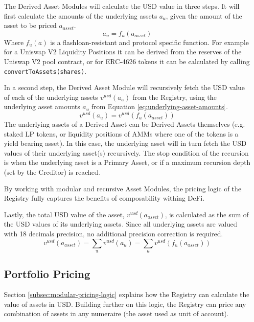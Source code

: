 \documentclass[sigconf,nonacm]{acmart}
\begin{document}
The Derived Asset Modules will calculate the USD value in three steps.
It will first calculate the amounts of the underlying assets $a_{u}$, given the amount of the asset to be priced $a_{asset}$.
\begin{equation}
    \label{eq:underlying-asset-amounts}
    a_{u} = f_{u}(a_{asset})
\end{equation}
Where $f_{u}(a)$ is a flashloan-resistant and protocol specific function.
For example for a Uniswap V2 Liquidity Positions it can be derived from the reserves of the Uniswap V2 pool contract,
or for ERC-4626 tokens it can be calculated by calling \texttt{convertToAssets(shares)}.

In a second step, the Derived Asset Module will recursively fetch the USD value of each of the underlying assets $v^{usd}(a_{u})$ from the Registry,
using the underlying asset amounts $a_{u}$ from Equation \ref{eq:underlying-asset-amounts}.
\begin{equation}
    v^{usd}(a_{u}) = v^{usd}(f_{u}(a_{asset}))
\end{equation}
The underlying assets of a Derived Asset can be Derived Assets themselves (e.g. staked LP tokens, or liquidity positions of AMMs where one of the tokens is a yield bearing asset).
In this case, the underlying asset will in turn fetch the USD values  of their underlying asset(s) recursively.
The stop condition of the recursion is when the underlying asset is a Primary Asset, or if a maximum recursion depth (set by the Creditor) is reached.

By working with modular and recursive Asset Modules, the pricing logic of the Registry fully captures the benefits of composability withing DeFi.

Lastly, the total USD value of the asset, $v^{usd}(a_{asset})$, is calculated as the sum of the USD values of its underlying assets.
Since all underlying assets are valued with 18 decimals precision, no additional precision correction is required.
\begin{equation}
    v^{usd}(a_{asset}) = \sum_{u}{v^{usd}(a_{u})} = \sum_{u}{v^{usd}(f_{u}(a_{asset}))}
\end{equation}

\subsection{Portfolio Pricing}
\label{subsec:portfolio-pricing}
Section \ref{subsec:modular-pricing-logic} explains how the Registry can calculate the value of assets in USD.
Building further on this logic, the Registry can price any combination of assets in any numeraire (the asset used as unit of account).
\end{document}
